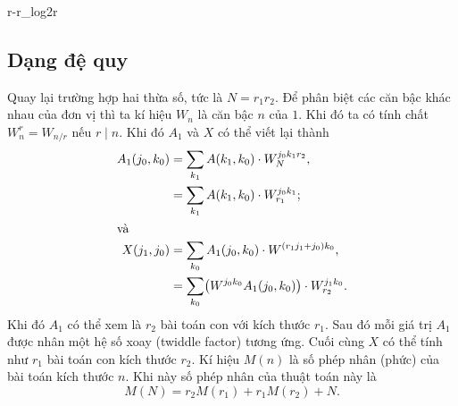 \begin{table}[htbp]
  \centering
  \caption{Giá trị khảo sát $r$ và $r / \log_2(r)$}
  \label{tab:r-r_log2r}
  {r-r_log2r}
\end{table}

\subsection{Dạng đệ quy}

Quay lại trường hợp hai thừa số, tức là $N = r_1r_2$. Để phân biệt các căn bậc
khác nhau của đơn vị thì ta kí hiệu $W_n$ là căn bậc $n$ của $1$. Khi đó ta có
tính chất $W_n^r = W_{n/r}$ nếu $r \mid n$. Khi đó $A_1$ và $X$ có thể viết lại
thành \begin{align}
  A_1(j_0, k_0) &= \sum_{k_1} A(k_1, k_0) \cdot W_N^{j_0k_1r_2}, \\
  &= \sum_{k_1} A(k_1, k_0) \cdot W_{r_1}^{j_0k_1}; \\
  \intertext{và}
  X(j_1, j_0) &= \sum_{k_0} A_1(j_0, k_0) \cdot W^{(r_1j_1 + j_0)k_0}, \\
  &= \sum_{k_0} \bigl(W^{j_0k_0}A_1(j_0, k_0)\bigr) \cdot W_{r_2}^{j_1k_0}.
\end{align} Khi đó $A_1$ có thể xem là $r_2$ bài toán con với kích thước $r_1$.
Sau đó mỗi giá trị $A_1$ được nhân một hệ số xoay (twiddle factor) tương ứng.
Cuối cùng $X$ có thể tính như $r_1$ bài toán con kích thước $r_2$. Kí hiệu
$M(n)$ là số phép nhân (phức) của bài toán kích thước $n$. Khi này số phép nhân
của thuật toán này là \begin{equation}
  M(N) = r_2M(r_1) + r_1M(r_2) + N.
\end{equation}

